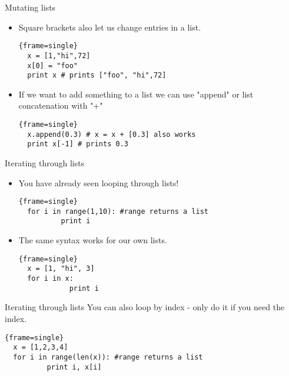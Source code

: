 \documentclass{beamer}
\begin{document}
\begin{frame}[fragile]{Mutating lists}
  \begin{itemize}
  \item {
  Square brackets also let us change entries in a list.
  \begin{block}{}
  \begin{lstlisting}{frame=single}
  x = [1,"hi",72]
  x[0] = "foo"
  print x # prints ["foo", "hi",72]
  \end{lstlisting}
\end{block}
  }
  \pause
  \item {
  If we want to add something to a list we can use "append" or list concatenation with "+"
  \begin{block}{}
\begin{lstlisting}{frame=single}
  x.append(0.3) # x = x + [0.3] also works 
  print x[-1] # prints 0.3
  \end{lstlisting}
\end{block}
  }
  \end{itemize}
\end{frame}
\begin{frame}[fragile]{Iterating through lists}
  \begin{itemize}
  \item {
  You have already seen looping through lists!
  \begin{block}{}
  \begin{lstlisting}{frame=single}
  for i in range(1,10): #range returns a list
	      print i
  \end{lstlisting}
\end{block}
  }
  \pause
  \item {
  The same syntax works for our own lists.
  \begin{block}{}
\begin{lstlisting}{frame=single}
  x = [1, "hi", 3]
  for i in x:
		    print i
  \end{lstlisting}
\end{block}
  }
  \end{itemize}
\end{frame}
\begin{frame}[fragile]{Iterating through lists}
  You can also loop by index - only do it if you need the index.
  \begin{block}{}
  \begin{lstlisting}{frame=single}
  x = [1,2,3,4]
  for i in range(len(x)): #range returns a list
	      print i, x[i]
  \end{lstlisting}
\end{block}
\end{frame}
\end{document}
